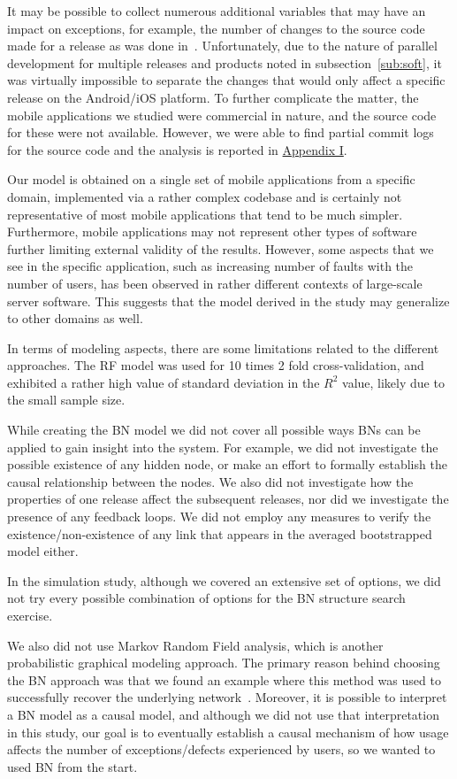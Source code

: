 \documentclass[smallcondensed]{svjour3}     %
\begin{document}
It may be possible to collect numerous additional variables that may
have an impact on exceptions, for example, the number of changes to
the source code made for a release as was done
in~\cite{IQ08}. Unfortunately, due to the nature of parallel
development for multiple releases and products noted in
subsection~\ref{sub:soft}, it was virtually impossible to separate
the changes that would only affect a specific release on the Android/iOS
platform. To further complicate the matter, the mobile applications we studied
were commercial in nature, and the source code for these were not available.
However, we were able to find partial commit logs for the source code and the 
analysis is reported in \hyperref[app1]{Appendix I}.  

Our model is obtained on a single set of mobile applications 
from a specific domain, implemented via
a rather complex codebase and is certainly not representative of
most mobile applications that tend to be much simpler. Furthermore,
mobile applications  
may not represent other types of software further limiting external
validity of the results. However, some aspects that we see in the
specific application, such as increasing number of faults with the
number of users, has been observed in rather different contexts of
large-scale server software. This suggests that the model derived in
the study may generalize to other domains as well. 


In terms of modeling aspects, there are some limitations related to the different approaches.
 The RF model was used for 10 times 2 fold cross-validation, and exhibited a rather high value of standard deviation in the $R^2$ value,  likely due to the small sample size.

While creating the BN model we did not cover all possible ways BNs can be applied to gain insight into the system. For example, we did not investigate the possible existence of any hidden node, or make an effort to formally establish the causal relationship between the nodes. We also did not investigate how the properties of one release affect the subsequent releases, nor did we investigate the presence of any feedback loops. We did not employ any measures to verify the existence/non-existence of any link that appears in the averaged bootstrapped model either.

In the simulation study, although we covered an extensive set of options, we did not try every possible combination of options for the BN structure search exercise.

We also did not use Markov Random Field analysis, which is another probabilistic graphical modeling approach. The primary reason behind choosing the BN approach was that we found an example where this method was used to successfully recover the underlying network~\cite{bnppt}. 
Moreover, it is possible to interpret a BN model as a causal model, and although we did not use that interpretation in this study, our goal is to eventually establish a causal mechanism of how usage affects the number of exceptions/defects experienced by users, so we wanted to used BN from the start.
\end{document}
